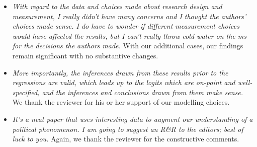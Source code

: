 \documentclass[12pt]{article}
\begin{document}
\begin{itemize}
\item \emph{With regard to the data and choices made about research design and measurement, 
I really didn't have many concerns and I thought the authors' choices made sense. 
I do have to wonder if different measurement choices would have affected the results, but I 
can't really throw cold water on the ms for the decisions the authors made.} With our additional
cases, our findings remain significant with no substantive changes.

\item \emph{More importantly, the inferences drawn from these results prior 
to the regressions are valid, which leads up to the logits which are on-point 
and well-specified, and the inferences and conclusions drawn from them make sense.} We thank the reviewer
for his or her support of our modelling choices.


\item \emph{It's a neat paper that uses interesting data to augment our understanding 
of a political phenomenon. I am going to suggest an R&R to the editors; best of luck to you.}
Again, we thank the reviewer for the constructive comments. 

\end{itemize}
\end{document}
